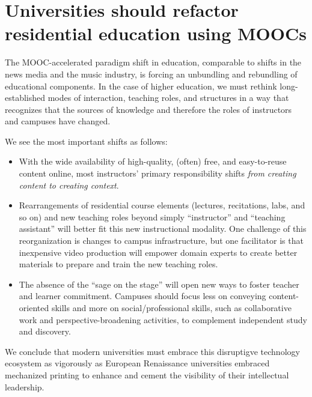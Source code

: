 \section{Universities should refactor residential education using MOOCs}



The MOOC-accelerated paradigm shift in education, comparable to shifts
in the news media and the music industry,
is forcing an unbundling and rebundling of educational components. In the
case of higher education, 
we must rethink long-established modes of interaction, teaching roles,
and structures in a way that recognizes
that the sources of knowledge and therefore the roles of instructors and
campuses have changed.

We see the most important shifts as follows:

\begin{itemize}

\item With the wide availability of high-quality, (often) free, and
easy-to-reuse content online, most instructors' primary responsibility
shifts \emph{from creating content to creating context}.

\item Rearrangements of residential course elements (lectures,
  recitations, labs, and so on) and new teaching roles beyond simply ``instructor''
  and ``teaching assistant'' will better fit this new instructional
  modality.  One challenge of this reorganization is changes to campus
  infrastructure, but one facilitator is that inexpensive video production
  will empower domain experts to create 
  better materials to prepare and train the new teaching roles.

\item The absence of the ``sage on the stage'' will open new ways to
foster teacher and learner commitment.  Campuses should
focus less on conveying content-oriented skills and more on
social/professional skills, such as collaborative work and
perspective-broadening activities, to complement  independent study
and discovery.

\end{itemize} 

We conclude that modern universities must embrace this disruptigve
technology ecosystem as vigorously as European Renaissance universities
embraced mechanized printing to enhance and cement the
visibility of their intellectual leadership.


